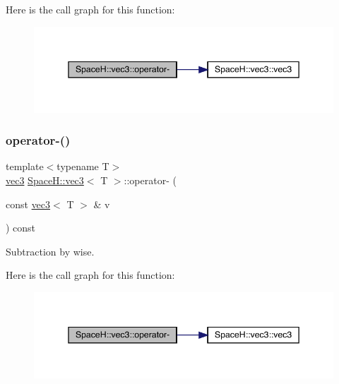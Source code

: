 Here is the call graph for this function\+:
\nopagebreak
\begin{figure}[H]
\begin{center}
\leavevmode
\includegraphics[width=345pt]{struct_space_h_1_1vec3_a8af5f368ccbf70d24d528592acfc6278_cgraph}
\end{center}
\end{figure}
\mbox{\label{struct_space_h_1_1vec3_a8af5f368ccbf70d24d528592acfc6278}} 
\subsubsection{\texorpdfstring{operator-\/()}{operator-()}\hspace{0.1cm}{\footnotesize\ttfamily [2/11]}}
{\footnotesize\ttfamily template$<$typename T$>$ \\
\mbox{\hyperlink{struct_space_h_1_1vec3}{vec3}} \mbox{\hyperlink{struct_space_h_1_1vec3}{Space\+H\+::vec3}}$<$ T $>$\+::operator-\/ (\begin{DoxyParamCaption}\item[{const \mbox{\hyperlink{struct_space_h_1_1vec3}{vec3}}$<$ T $>$ \&}]{v }\end{DoxyParamCaption}) const\hspace{0.3cm}{\ttfamily [inline]}}



Subtraction by wise. 

Here is the call graph for this function\+:
\nopagebreak
\begin{figure}[H]
\begin{center}
\leavevmode
\includegraphics[width=345pt]{struct_space_h_1_1vec3_a8af5f368ccbf70d24d528592acfc6278_cgraph}
\end{center}
\end{figure}
\mbox{\label{struct_space_h_1_1vec3_a8af5f368ccbf70d24d528592acfc6278}} 
